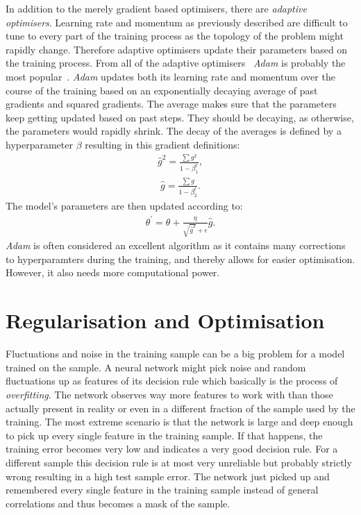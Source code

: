 In addition to the merely gradient based optimisers, there are \emph{adaptive optimisers}. Learning rate and momentum as previously described are difficult to tune to every part of the training process as the topology of the problem might rapidly change. Therefore adaptive optimisers update their parameters based on the training process. From all of the adaptive optimisers~\cite{chollet2015keras} \emph{Adam} is probably the most popular~\cite{2014arXiv1412.6980K}. \emph{Adam} updates both its learning rate and momentum over the course of the training based on an exponentially decaying average of past gradients and squared gradients. The average makes sure that the parameters keep getting updated based on past steps. They should be decaying, as otherwise, the parameters would rapidly shrink. The decay of the averages is defined by a hyperparameter $\beta$ resulting in this gradient definitions:
%
\begin{align}
    \hat{g}^2 = \frac{\sum g^2}{1 - \beta_1^t},
\end{align}
%
\begin{align}
    \hat{g} = \frac{\sum g}{1 - \beta_2^t}.
\end{align}
%
The model's parameters are then updated according to:
%
\begin{align}
    \theta^{\prime} = \theta + \frac{\eta}{\sqrt{\hat{g}^2} + \epsilon} \hat{g}.
\end{align}
%
\emph{Adam} is often considered an excellent algorithm as it contains many corrections to hyperparamters during the training, and thereby allows for easier optimisation. However, it also needs more computational power.


\section{Regularisation and Optimisation}

Fluctuations and noise in the training sample can be a big problem for a model trained on the sample. A neural network might pick noise and random fluctuations up as features of its decision rule which basically is the process of \emph{overfitting}.
The network observes way more features to work with than those actually present in reality or even in a different fraction of the sample used by the training. The most extreme scenario is that the network is large and deep enough to pick up every single feature in the training sample. If that happens, the training error becomes very low and indicates a very good decision rule. For a different sample this decision rule is at most very unreliable but probably strictly wrong resulting in a high test sample error. The network just picked up and remembered every single feature in the training sample instead of general correlations and thus becomes a mask of the sample.

